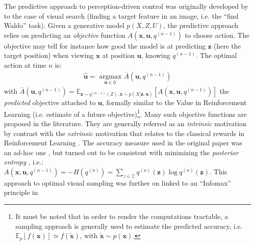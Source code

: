 \documentclass{article}
\begin{document}
The predictive approach to perception-driven control was originally developed by \cite{najemnik2005optimal} to the case of visual search (finding a target feature in an image, i.e. the ``find Waldo'' task).
Given a generative model $p(X,Z,U)$,  the predictive approach relies on predicting an \emph{objective} function $A(\boldsymbol{x}, \boldsymbol{u}, q^{(n-1)})$ to choose action. 
The objective may tell for instance how good the model is at predicting $\boldsymbol{z}$ (here the target position) when viewing $\boldsymbol{x}$ at position $\boldsymbol{u}$,
knowing $q^{(n-1)}$.
The optimal action at time $n$ is:
\begin{align}
\hat{\boldsymbol{u}} = \underset{\boldsymbol{u} \in \mathcal{U}}{\text{ argmax }} \bar{A}(\boldsymbol{u}, q^{(n-1)})
\label{eq:predictive-policy}
\end{align}
with $\bar{A}(\boldsymbol{u}, q^{(n-1)})
= \mathbb{E}_{\boldsymbol{z} \sim q^{(n-1)}(Z), \boldsymbol{x} \sim p(X|\boldsymbol{z}, \boldsymbol{u})}\left[A(\boldsymbol{x}, \boldsymbol{u}, q^{(n-1)})\right]$ the \emph{predicted} objective attached to $\boldsymbol{u}$, 
formally similar to the Value in Reinforcement Learning (i.e. estimate of a future objective)\footnote{It must be noted that in order to render the computations tractable, a sampling approach is generally used to estimate the predicted accuracy, i.e. $\mathbb{E}_p[f(\boldsymbol{x})] \simeq f(\tilde{\boldsymbol{x}})$, with $\tilde{\boldsymbol{x}}\sim p(\boldsymbol{x})$.}.
Many such objective functions are proposed in the literature. They are generally referred as an \emph{intrinsic} motivation \cite{oudeyer2008can} by contrast with the \emph{extrinsic} motivation that relates to the classical rewards in Reinforcement Learning \cite{sutton1998reinforcement}.
The accuracy measure used in the original paper was an ad-hoc one \cite{najemnik2005optimal}, but turned out to be consistent with minimizing the \emph{posterior entropy} \cite{najemnik2009simple}, i.e.:
$A(\boldsymbol{x}, \boldsymbol{u}, q^{(n-1)}) = -H(q^{(n)}) = \sum_{z \in \mathcal{Z}} q^{(n)}(\boldsymbol{z}) \log q^{(n)}(\boldsymbol{z})$. This approach to optimal visual sampling was further on linked to an ``Infomax'' principle in \cite{butko2010infomax} 
\end{document}
